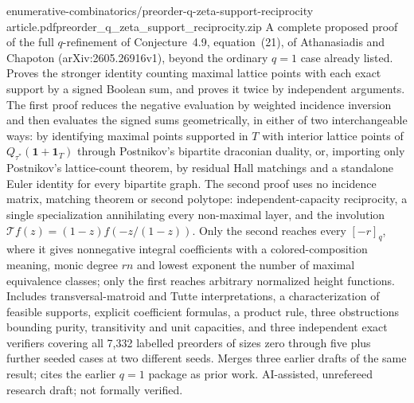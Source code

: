 {enumerative-combinatorics/preorder-q-zeta-support-reciprocity}
{article.pdf}{preorder\_q\_zeta\_support\_reciprocity.zip}
{A complete proposed proof of the full $q$-refinement of Conjecture~4.9,
 equation~(21), of Athanasiadis and Chapoton (arXiv:2605.26916v1), beyond the
 ordinary $q=1$ case already listed. Proves the stronger identity counting
 maximal lattice points with each exact support by a signed Boolean sum, and
 proves it twice by independent arguments. The first proof reduces the negative
 evaluation by weighted incidence inversion and then evaluates the signed sums
 geometrically, in either of two interchangeable ways: by identifying maximal
 points supported in $T$ with interior lattice points of
 $Q_{\tau^*}(\mathbf1+\mathbf1_T)$ through Postnikov's bipartite draconian
 duality, or, importing only Postnikov's lattice-count theorem, by residual
 Hall matchings and a standalone Euler identity for every bipartite graph. The
 second proof uses no incidence matrix, matching theorem or second polytope:
 independent-capacity reciprocity, a single specialization annihilating every
 non-maximal layer, and the involution $\mathcal T f(z)=(1-z)f(-z/(1-z))$.
 Only the second reaches every $[-r]_q$, where it gives nonnegative integral
 coefficients with a colored-composition meaning, monic degree $rn$ and lowest
 exponent the number of maximal equivalence classes; only the first reaches
 arbitrary normalized height functions. Includes transversal-matroid and Tutte
 interpretations, a characterization of feasible supports, explicit coefficient
 formulas, a product rule, three obstructions bounding purity, transitivity and
 unit capacities, and three independent exact verifiers covering all 7,332
 labelled preorders of sizes zero through five plus further seeded cases at two
 different seeds. Merges three earlier drafts of the same result; cites the
 earlier $q=1$ package as prior work. AI-assisted, unrefereed research draft;
 not formally verified.}
